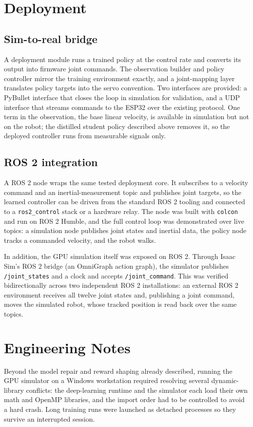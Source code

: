 \documentclass[11pt]{article}
\begin{document}
\section{Deployment}
\subsection{Sim-to-real bridge}
A deployment module runs a trained policy at the control rate and converts its
output into firmware joint commands. The observation builder and policy
controller mirror the training environment exactly, and a joint-mapping layer
translates policy targets into the servo convention. Two interfaces are provided:
a PyBullet interface that closes the loop in simulation for validation, and a UDP
interface that streams commands to the ESP32 over the existing protocol. One term
in the observation, the base linear velocity, is available in simulation but not
on the robot; the distilled student policy described above removes it, so the
deployed controller runs from measurable signals only.

\subsection{ROS 2 integration}
A ROS 2 node wraps the same tested deployment core. It subscribes to a velocity
command and an inertial-measurement topic and publishes joint targets, so the
learned controller can be driven from the standard ROS 2 tooling and connected to
a \texttt{ros2\_control} stack or a hardware relay. The node was built with
\texttt{colcon} and run on ROS 2 Humble, and the full control loop was
demonstrated over live topics: a simulation node publishes joint states and
inertial data, the policy node tracks a commanded velocity, and the robot walks.

In addition, the GPU simulation itself was exposed on ROS 2. Through Isaac Sim's
ROS 2 bridge (an OmniGraph action graph), the simulator publishes
\texttt{/joint\_states} and a clock and accepts \texttt{/joint\_command}. This
was verified bidirectionally across two independent ROS 2 installations: an
external ROS 2 environment receives all twelve joint states and, publishing a
joint command, moves the simulated robot, whose tracked position is read back
over the same topics.

\section{Engineering Notes}
Beyond the model repair and reward shaping already described, running the GPU
simulator on a Windows workstation required resolving several dynamic-library
conflicts: the deep-learning runtime and the simulator each load their own math
and OpenMP libraries, and the import order had to be controlled to avoid a hard
crash. Long training runs were launched as detached processes so they survive an
interrupted session.
\end{document}
